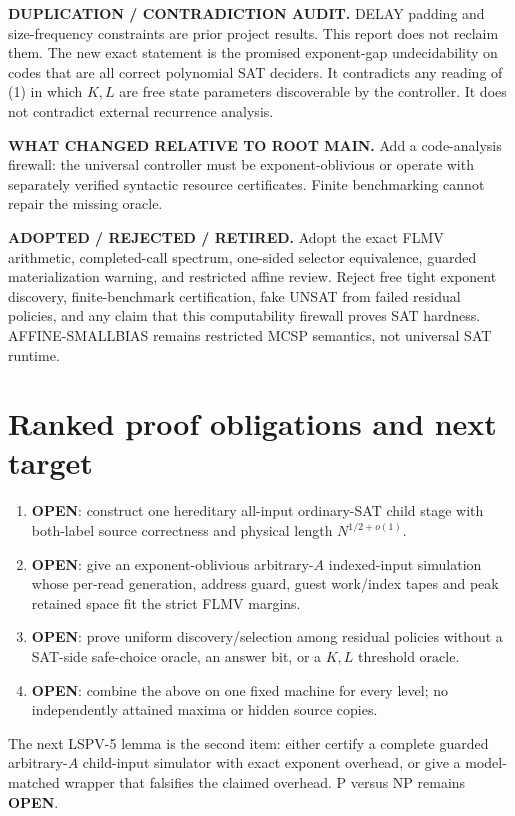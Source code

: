 \documentclass[11pt]{article}
\newcommand{\OPEN}{\textbf{OPEN}}
\begin{document}
\textbf{DUPLICATION / CONTRADICTION AUDIT.} DELAY padding and size-frequency constraints are prior project results. This report does not reclaim them. The new exact statement is the promised exponent-gap undecidability on codes that are all correct polynomial SAT deciders. It contradicts any reading of (1) in which $K,L$ are free state parameters discoverable by the controller. It does not contradict external recurrence analysis.

\textbf{WHAT CHANGED RELATIVE TO ROOT MAIN.} Add a code-analysis firewall: the universal controller must be exponent-oblivious or operate with separately verified syntactic resource certificates. Finite benchmarking cannot repair the missing oracle.

\textbf{ADOPTED / REJECTED / RETIRED.} Adopt the exact FLMV arithmetic, completed-call spectrum, one-sided selector equivalence, guarded materialization warning, and restricted affine review. Reject free tight exponent discovery, finite-benchmark certification, fake UNSAT from failed residual policies, and any claim that this computability firewall proves SAT hardness. AFFINE-SMALLBIAS remains restricted MCSP semantics, not universal SAT runtime.

\section{Ranked proof obligations and next target}
\begin{enumerate}
\item \OPEN: construct one hereditary all-input ordinary-SAT child stage with both-label source correctness and physical length $N^{1/2+o(1)}$.
\item \OPEN: give an exponent-oblivious arbitrary-$A$ indexed-input simulation whose per-read generation, address guard, guest work/index tapes and peak retained space fit the strict FLMV margins.
\item \OPEN: prove uniform discovery/selection among residual policies without a SAT-side safe-choice oracle, an answer bit, or a $K,L$ threshold oracle.
\item \OPEN: combine the above on one fixed machine for every level; no independently attained maxima or hidden source copies.
\end{enumerate}
The next LSPV-5 lemma is the second item: either certify a complete guarded arbitrary-$A$ child-input simulator with exact exponent overhead, or give a model-matched wrapper that falsifies the claimed overhead. P versus NP remains \OPEN.
\end{document}
